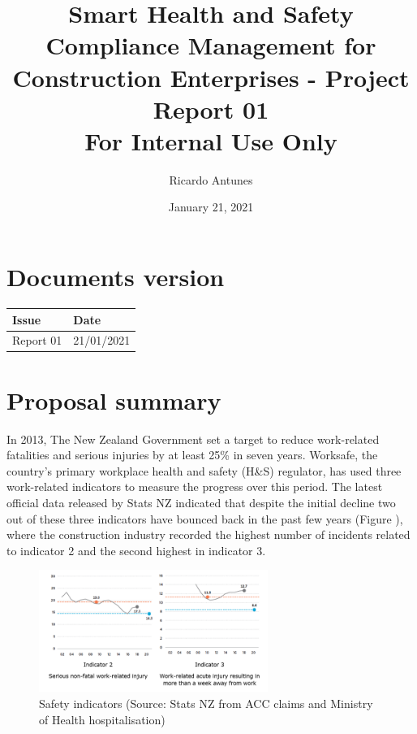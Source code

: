 \documentclass{article}
\author{Ricardo Antunes}
\date{January 21, 2021}
\title{Smart Health and Safety Compliance Management for Construction Enterprises - Project Report 01\\\medskip
\large For Internal Use Only}
\begin{document}
\maketitle
\tableofcontents


\section{Documents version}
\label{sec:orgaa53bb5}
\begin{center}
\begin{tabular}{ll}
Issue & Date\\
\hline
Report 01 & 21/01/2021\\
\end{tabular}
\end{center}
\section{Proposal summary}
\label{sec:orga8cf5d7}

In 2013, The New Zealand Government set a target to reduce work-related fatalities and serious injuries by at least 25\% in seven years. 
Worksafe, the country's primary workplace health and safety (H\&S) regulator, has used three work-related indicators to measure the progress over this period. 
The latest official data released by Stats NZ indicated that despite the initial decline two out of these three indicators have bounced back in the past few years (Figure \label{orgcb5052e}), where the construction industry recorded the highest number of incidents related to indicator 2 and the second highest in indicator 3.  

\begin{figure}[htbp]
\centering
\includegraphics[height=150]{./Images/fig_01.png}
\caption{\label{fig:org571a955}Safety indicators (Source: Stats NZ from ACC claims and Ministry of Health hospitalisation)}
\end{figure}
\end{document}
